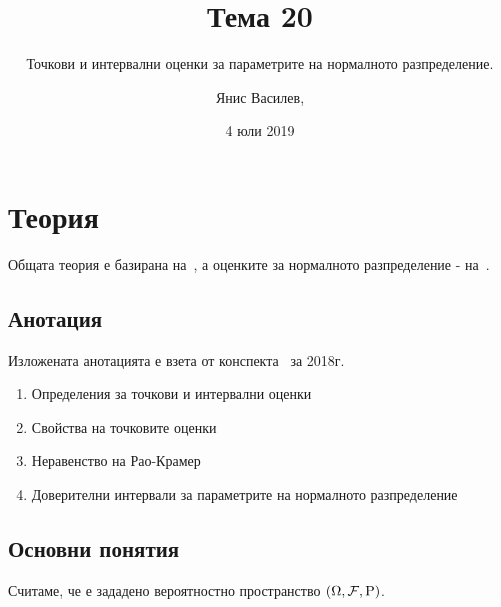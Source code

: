 \documentclass[numbers=endperiod, DIV=15, bibliography=totocnumbered]{scrartcl}
\title{Тема 20}
\subtitle{Точкови и интервални оценки за параметрите на нормалното разпределение.}
\author{Янис Василев, \Email{ianis@ivasilev.net}}
\date{4 юли 2019}
\begin{document}
\maketitle

\section{Теория}

Общата теория е базирана на~\cite{DimitrovYanev}, а оценките за нормалното разпределение - на~\cite{ASLectures}.

\subsection{Анотация}

Изложената анотацията е взета от конспекта~\cite{Syllabus} за 2018г.

\begin{enumerate}
  \item Определения за точкови и интервални оценки
  \item Свойства на точковите оценки
  \item Неравенство на Рао-Крамер
  \item Доверителни интервали за параметрите на нормалното разпределение
\end{enumerate}

\subsection{Основни понятия}

Считаме, че е зададено вероятностно пространство $(\Omega, \mathcal{F}, \operatorname{P})$.
\end{document}
